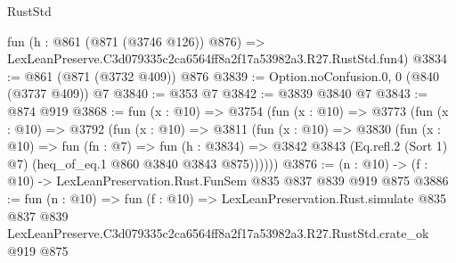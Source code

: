 \begin{lexlean}{RustStd}
\begin{coremodule}
    fun (h : @861 (@871 (@3746 @126)) @876) =>
    LexLeanPreserve.C3d079335c2ca6564ff8a2f17a53982a3.R27.RustStd.fun4)
@3834 := @861 (@871 (@3732 @409)) @876
@3839 := Option.noConfusion.{0, 0} (@840 (@3737 @409)) @7
@3840 := @353 @7
@3842 := @3839 @3840 @7
@3843 := @874 @919
@3868 := fun (x : @10) =>
  @3754
    (fun (x : @10) =>
    @3773
      (fun (x : @10) =>
      @3792
        (fun (x : @10) =>
        @3811
          (fun (x : @10) =>
          @3830
            (fun (x : @10) =>
            fun (fn : @7) =>
            fun (h : @3834) =>
            @3842 @3843 (Eq.refl.{2} (Sort 1) @7) (heq_of_eq.{1} @860 @3840 @3843 @875))))))
@3876 := (n : @10) -> (f : @10) -> LexLeanPreservation.Rust.FunSem @835 @837 @839 @919 @875
@3886 := fun (n : @10) =>
  fun (f : @10) =>
  LexLeanPreservation.Rust.simulate
    @835
    @837
    @839
    LexLeanPreserve.C3d079335c2ca6564ff8a2f17a53982a3.R27.RustStd.crate_ok
    @919
    @875
\end{coremodule}
\end{lexlean}
